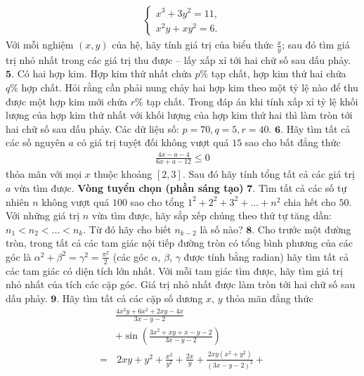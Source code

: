\begin{multicols}{2}
\begin{align*}
		\begin{cases}
			x^3 + 3y^2 = 11,\\
			x^2y + xy^2 = 6.
		\end{cases}
	\end{align*}
	Với mỗi nghiệm $(x,y)$ của hệ, hãy tính giá trị của biểu thức $\frac{x}{y}$; sau đó tìm giá trị nhỏ nhất trong các giá trị thu được -- lấy xấp xỉ tới hai chữ số sau dấu phảy.
	\vskip 0.1cm
	$\pmb{5.}$ Có hai hợp kim. Hợp kim thứ nhất chứa $p\%$ tạp chất, hợp kim thứ hai chứa $q\%$ hợp chất. Hỏi rằng cần phải nung chảy hai hợp kim theo một tỷ lệ nào để thu được một hợp kim mới chứa $r\%$ tạp chất. Trong đáp án khi tính xấp xỉ tỷ lệ khối lượng của hợp kim thứ nhất với khối lượng của hợp kim thứ hai thì làm tròn tới hai chữ số sau \linebreak dấu phảy.
	\vskip 0.1cm
	Các dữ liệu số: $p = 70, q = 5, r = 40$.
	\vskip 0.1cm
	$\pmb{6.}$ Hãy tìm tất cả các số nguyên $a$ có giá trị tuyệt đối không vượt quá $15$ sao cho bất đẳng thức 
	\begin{align*}
		\frac{{4x - a - 4}}{{6x + a - 12}} \le 0
	\end{align*}
	thỏa mãn với mọi $x$ thuộc khoảng  $[2,3]$. Sau đó hãy tính tổng tất cả các giá trị $a$ vừa tìm được.
	\vskip 0.1cm
	\textbf{\color{cackithi}Vòng tuyển chọn (phần sáng tạo)}
	\vskip 0.1cm
	$\pmb{7.}$ Tìm tất cả các số tự nhiên $n$ không vượt quá $100$ sao cho tổng ${1^2} + {2^2} + {3^2} + ... + {n^2}$  chia hết cho $50$.
	\vskip 0.1cm
	Với những giá trị $n$ vừa tìm được, hãy sắp xếp chúng theo thứ tự tăng dần:  ${n_1} < {n_2} < ... < {n_k}$. Từ đó hãy cho biết $n_{k-2}$ là số nào?
	\vskip 0.1cm
	$\pmb{8.}$ Cho trước một đường tròn, trong tất cả các tam giác nội tiếp đường tròn có tổng bình phương của các góc là $\alpha^2 + \beta^2 = \gamma^2 = \frac{\pi^2}{2}$ (các góc  $\alpha$,  $\beta$, $\gamma$ được tính bằng radian) hãy tìm tất cả các tam giác có diện tích \linebreak lớn nhất.
	\vskip 0.1cm
	Với mỗi tam giác tìm được, hãy tìm giá trị nhỏ nhất của tích các cặp góc. Giá trị nhỏ nhất được làm tròn tới hai chữ số sau dấu phảy. 
	\vskip 0.1cm
	$\pmb{9.}$ Hãy tìm tất cả các cặp số dương $x$, $y$ thỏa mãn đẳng thức
	\begin{align*}
		&\frac{{4{x^2}y + 6{x^2} + 2xy - 4x}}{{3x - y - 2}} \\
		&+ \sin \left( {\frac{{3{x^2} + xy + x - y - 2}}{{3x - y - 2}}} \right)\\
		= &\,2xy + {y^2} + \frac{{{x^2}}}{{{y^2}}} + \frac{{2x}}{y} + \frac{{2xy({x^2} + {y^2})}}{{{{(3x - y - 2)}^2}}} + \\

\end{align*}
\end{multicols}
